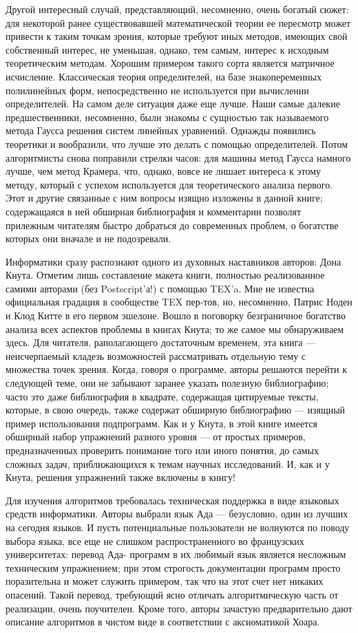 \documentclass{mai_book}
\begin{document}
{{  Другой интересный случай, представляющий, несомненно, очень богатый сюжет: для некоторой ранее существовавшей математической теории ее пересмотр может привести к таким точкам зрения, которые требуют иных методов, имеющих свой собственный интерес, не уменьшая, однако, тем самым, интерес к исходным теоретическим методам. Хорошим примером такого сорта является матричное исчисление. Классическая теория определителей, на базе знакопеременных полилинейных форм, непосредственно не используется при вычислении определителей. На самом деле ситуация даже еще лучше. Наши самые далекие предшественники, несомненно, были знакомы с сущностью так называемого метода Гаусса решения систем линейных уравнений. Однажды появились теоретики и вообразили, что лучше это делать с помощью определителей. Потом алгоритмисты снова поправили стрелки часов: для машины метод Гаусса намного лучше, чем метод Крамера, что, однако, вовсе не лишает интереса к этому методу, который с успехом используется для теоретического анализа первого. Этот и другие связанные с ним вопросы изящно изложены в данной книге; содержащаяся в ней обширная библиография и комментарии позволят прилежным читателям быстро добраться до современных проблем, о богатстве которых они вначале и не подозревали.

   Информатики сразу распознают одного из духовных наставников авторов: Дона Кнута. Отметим лишь составление макета книги, полностью реализованное самими авторами (без Postscript’а!) с помощью TEX'a. Мне не известна официальная градация в сообществе TEX пер-тов, но, несомненно, Патрис Ноден и Клод Китте в его первом эшелоне.
\newpage
   Вошло в поговорку безграничное богатство анализа всех аспектов проблемы в книгах Кнута; то же самое мы обнаруживаем здесь. Для читателя, раполагающего достаточным временем, эта книга — неисчерпаемый кладезь возможностей рассматривать отдельную тему с множества точек зрения. Когда, говоря о программе, авторы решаются перейти к следующей теме, они не забывают заранее указать полезную библиографию; часто это даже библиография в квадрате, содержащая цитируемые тексты, которые, в свою очередь, также содержат обширную библиографию — изящный пример использования подпрограмм. Как и у Кнута, в этой книге имеется обширный набор упражнений разного уровня — от простых примеров, предназначенных проверить понимание того или иного понятия, до самых сложных задач, приближающихся к темам научных исследований. И, как и у Кнута, решения упражнений также включены в книгу!

  Для изучения алгоритмов требовалась техническая поддержка в виде языковых средств информатики. Авторы выбрали язык Ада — безусловно, один из лучших на сегодня языков. И пусть потенциальные пользователи не волнуются по поводу выбора языка, все еще не слишком распространенного во французских университетах: перевод Ада- программ в их любимый язык является несложным техническим упражнением; при этом строгость документации программ просто поразительна и может служить примером, так что на этот счет нет никаких опасений. Такой перевод, требующий ясно отличать алгоритмическую часть от реализации, очень поучителен. Кроме того, авторы зачастую предварительно дают описание алгоритмов в чистом виде в соответствии с аксиоматикой Хоара.

}}
\end{document}

